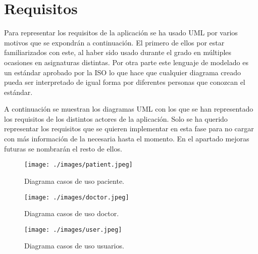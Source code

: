 \section{Requisitos}
Para representar los requisitos de la aplicación se ha usado UML\cite{uml} por varios
motivos que se expondrán a continuación. El primero de ellos por estar familiarizados
con este, al haber sido usado durante el grado en múltiples ocasiones en asignaturas
distintas. Por otra parte este lenguaje de modelado es un estándar aprobado por la ISO
lo que hace que cualquier diagrama creado pueda ser interpretado de igual forma por
diferentes personas que conozcan el estándar.

\medskip
A continuación se muestran los diagramas UML con los que se han representado los
requisitos de los distintos actores de la aplicación. Solo se ha querido representar los
requisitos que se quieren implementar en esta fase para no cargar con más información de
la necesaria hasta el momento. En el apartado mejoras futuras se nombrarán el resto de ellos.

\medskip
\begin{figure}
    \texttt{[image: ./images/patient.jpeg]}
    \caption{Diagrama casos de uso paciente.}
    \label{Diagrama casos de uso paciente.}
\end{figure}

\medskip
\begin{figure}
    \texttt{[image: ./images/doctor.jpeg]}
    \caption{Diagrama casos de uso doctor.}
    \label{Diagrama casos de uso doctor.}
\end{figure}

\medskip
\begin{figure}
    \texttt{[image: ./images/user.jpeg]}
    \caption{Diagrama casos de uso usuarios.}
    \label{Diagrama casos de uso usuarios.}
\end{figure}

